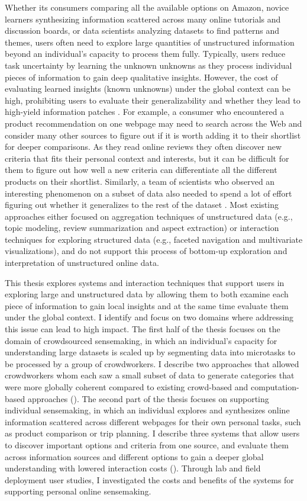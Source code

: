 Whether its consumers comparing all the available options on Amazon, novice learners synthesizing information scattered across many online tutorials and discussion boards, or data scientists analyzing datasets to find patterns and themes, users often need to explore large quantities of unstructured information beyond an individual's capacity to process them fully. Typically, users reduce task uncertainty by learning the unknown unknowns as they process individual pieces of information to gain deep qualitative insights. However, the cost of evaluating learned insights (known unknowns) under the global context can be high, prohibiting users to evaluate their generalizability and whether they lead to high-yield information patches \cite{pirolli1999information}. For example, a consumer who encountered a product recommendation on one webpage may need to search across the Web and consider many other sources to figure out if it is worth adding it to their shortlist for deeper comparisons. As they read online reviews they often discover new criteria that fits their personal context and interests, but it can be difficult for them to figure out how well a new criteria can differentiate all the different products on their shortlist. Similarly, a team of scientists who observed an interesting phenomenon on a subset of data also needed to spend a lot of effort figuring out whether it generalizes to the rest of the dataset \cite{charmaz2007grounded}. Most existing approaches either focused on aggregation techniques of unstructured data (e.g., topic modeling, review summarization and aspect extraction) or interaction techniques for exploring structured data (e.g., faceted navigation and multivariate visualizations), and do not support this process of bottom-up exploration and interpretation of unstructured online data.

This thesis explores systems and interaction techniques that support users in exploring large and unstructured data by allowing them to both examine each piece of information to gain local insights and at the same time evaluate them under the global context. I identify and focus on two domains where addressing this issue can lead to high impact. The first half of the thesis focuses on the domain of crowdsourced sensemaking, in which an individual’s capacity for understanding large datasets is scaled up by segmenting data into microtasks to be processed by a group of crowdworkers. I describe two approaches that allowed crowdworkers whom each saw a small subset of data to generate categories that were more globally coherent compared to existing crowd-based and computation-based approaches (). The second part of the thesis focuses on supporting individual sensemaking, in which an individual explores and synthesizes online information scattered across different webpages for their own personal tasks, such as product comparison or trip planning. I describe three systems that allow users to discover important options and criteria from one source, and evaluate them across information sources and different options to gain a deeper global understanding with lowered interaction costs  (). Through lab and field deployment user studies, I investigated the costs and benefits of the systems for supporting personal online sensemaking. 

